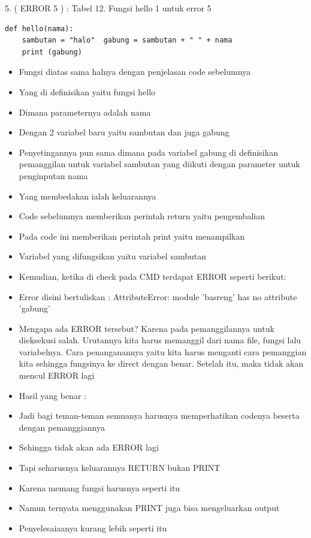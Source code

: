 5. ( ERROR 5 ) : 
Tabel 12. Fungsi hello 1 untuk error 5  
\begin{verbatim}
def hello(nama):  
	sambutan = "halo"  gabung = sambutan + " " + nama 
 	print (gabung) 
\end{verbatim}
\begin{itemize}
\item Fungsi diatas sama halnya dengan penjelasan code sebelumnya 
\item Yang di definisikan yaitu fungsi hello 
\item Dimana parameternya adalah nama 
\item Dengan 2 variabel baru yaitu sambutan dan juga gabung 
\item Penyetingannya pun sama dimana pada variabel gabung di definisikan pemanggilan untuk variabel sambutan yang diikuti dengan parameter untuk penginputan nama 
\item Yang membedakan ialah keluarannya 
\item Code sebelumnya memberikan perintah return yaitu pengembalian 
\item Pada code ini memberikan perintah print yaitu menampilkan 
\item Variabel yang difungsikan yaitu variabel sambutan 
\item Kemudian, ketika di check pada CMD terdapat ERROR seperti berikut: 
\item Error disini bertuliskan : AttributeError: module 'basreng' has no attribute 'gabung' 
\item Mengapa ada ERROR tersebut? Karena pada pemanggilannya untuk dieksekusi salah. Urutannya kita harus memanggil dari nama file, fungsi lalu variabelnya. Cara penanganannya yaitu kita harus menganti cara pemanggian kita sehingga fungsinya ke direct dengan benar. Setelah itu, maka tidak akan mencul ERROR lagi  
\item Hasil yang benar : 
\item Jadi bagi teman-teman semuanya harusnya memperhatikan codenya beserta dengan pemanggiannya 
\item Sehingga tidak akan ada ERROR lagi 
\item Tapi seharusnya keluarannya RETURN bukan PRINT 
\item Karena memang fungsi harusnya seperti itu 
\item Namun ternyata menggunakan PRINT juga bisa mengeluarkan output 
\item Penyelesaiaanya kurang lebih seperti itu
\end{itemize}


